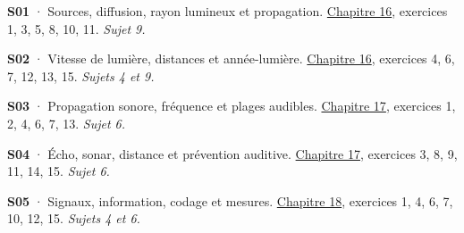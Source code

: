\par\noindent\begin{minipage}{\linewidth}\textbf{S01} · Sources, diffusion, rayon lumineux et propagation. \hyperref[chap-16]{Chapitre 16}, exercices 1, 3, 5, 8, 10, 11. \emph{Sujet 9.}\par\end{minipage}\par\vspace{2mm}
\par\noindent\begin{minipage}{\linewidth}\textbf{S02} · Vitesse de lumière, distances et année-lumière. \hyperref[chap-16]{Chapitre 16}, exercices 4, 6, 7, 12, 13, 15. \emph{Sujets 4 et 9.}\par\end{minipage}\par\vspace{2mm}
\par\noindent\begin{minipage}{\linewidth}\textbf{S03} · Propagation sonore, fréquence et plages audibles. \hyperref[chap-17]{Chapitre 17}, exercices 1, 2, 4, 6, 7, 13. \emph{Sujet 6.}\par\end{minipage}\par\vspace{2mm}
\par\noindent\begin{minipage}{\linewidth}\textbf{S04} · Écho, sonar, distance et prévention auditive. \hyperref[chap-17]{Chapitre 17}, exercices 3, 8, 9, 11, 14, 15. \emph{Sujet 6.}\par\end{minipage}\par\vspace{2mm}
\par\noindent\begin{minipage}{\linewidth}\textbf{S05} · Signaux, information, codage et mesures. \hyperref[chap-18]{Chapitre 18}, exercices 1, 4, 6, 7, 10, 12, 15. \emph{Sujets 4 et 6.}\par\end{minipage}\par\vspace{2mm}
